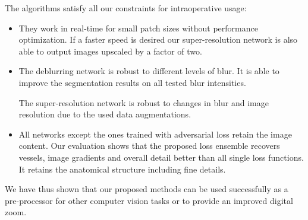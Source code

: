 \documentclass{scrartcl}
\begin{document}
The algorithms satisfy all our constraints for intraoperative usage:
\begin{itemize}
\item They work in real-time for small patch sizes without performance optimization.
  If a faster speed is desired our super-resolution network is also able to output images upscaled by a factor of two.
\item The deblurring network is robust to different levels of blur.
  It is able to improve the segmentation results on all tested blur intensities.

  The super-resolution network is robust to changes in blur and image resolution due to the used data augmentations.
\item All networks except the ones trained with adversarial loss retain the image content.
  Our evaluation shows that the proposed loss ensemble recovers vessels, image gradients and overall detail better than all single loss functions.
  It retains the anatomical structure including fine details.
\end{itemize}
We have thus shown that our proposed methods can be used successfully as a pre-processor for other computer vision tasks or to provide an improved digital zoom.

\FloatBarrier
\printbibliography
\end{document}
